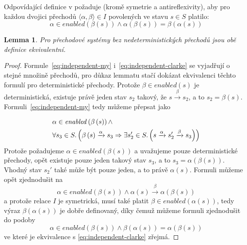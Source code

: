 \documentclass{fithesis2}
\newtheorem{lemma}     {Lemma}
\newcommand{\tuple}[1]{\langle #1 \rangle}
\begin{document}
Odpovídající definice v \cite{CLARKE} požaduje (kromě symetrie a antireflexivity), aby pro každou dvojici přechodů $\tuple{\alpha, \beta} \in I$ povolených ve stavu $s \in S $ platilo:
\begin{equation}\label{eq:independent-clarke}
\alpha \in \mathit{enabled}\left({ \beta\left({s}\right) }\right) \land
\alpha\left({\beta\left({s}\right)}\right) = \beta\left({\alpha\left({s}\right)}\right)
\end{equation}

\begin{lemma}
Pro přechodové systémy bez nedeterministických přechodů jsou obě definice ekvivalentní.
\end{lemma}

\begin{proof}
Formule~\ref{eq:independent-my} i~\ref{eq:independent-clarke} se vyjadřují o stejné množině přechodů, pro důkaz lemmatu stačí dokázat ekvivalenci těchto formulí pro deterministické přechody. Protože $\beta \in \mathit{enabled}(s)$ je deterministická, existuje právě jeden stav $s_2$ takový, že $s \xrightarrow{\beta} s_2$, a to $s_2 = \beta\left({s}\right)$. Formuli~\ref{eq:independent-my} tedy můžeme přepsat jako

\begin{equation}
\begin{split}
& \alpha \in \mathit{enabled}\left({\beta\left({s}\right)}\right)
\land \\
&\forall s_3 \in S \ldotp \left({
	\beta\left({s}\right) \xrightarrow{\alpha} s_3
	\Rightarrow
	\exists s_2' \in S \ldotp \left({
		s \xrightarrow{\alpha} s_2' \xrightarrow{\beta} s_3
	}\right)
}\right)
\end{split}
\end{equation}
Protože požadujeme $\alpha \in \mathit{enabled}\left({\beta\left({s}\right)}\right)$ a uvažujeme pouze deterministické přechody, opět existuje pouze jeden takový stav $s_3$, a to $s_3 = \alpha{\left({\beta\left({s}\right)}\right)}$. Vhodný stav $s_2'$ také může být pouze jeden, a to právě $\alpha\left({s}\right)$. Formuli můžeme opět zjednodušit na
\begin{equation}
\alpha \in \mathit{enabled}\left({\beta\left({s}\right)}\right)
\land
\alpha\left({s}\right) \xrightarrow{\beta} \alpha{\left({\beta\left({s}\right)}\right)}
\end{equation}
a protože relace $I$ je symetrická, musí také platit $\beta \in \mathit{enabled}\left({\alpha\left({s}\right)}\right)$, tedy výraz $\beta\left({\alpha\left({s}\right)}\right)$ je dobře definovaný, díky čemuž můžeme formuli zjednodušit do podoby
\begin{equation}
\alpha \in \mathit{enabled}\left({\beta\left({s}\right)}\right)
\land
\beta\left({\alpha\left({s}\right)}\right) = \alpha{\left({\beta\left({s}\right)}\right)}
\end{equation}
ve které je ekvivalence s \ref{eq:independent-clarke} zřejmá.
\end{proof}
\end{document}
